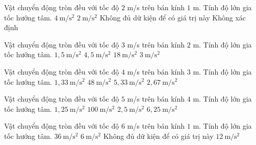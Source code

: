 

\begin{ex}
Vật chuyển động tròn đều với tốc độ $2$ m/s trên bán kính $1$ m. Tính độ lớn gia tốc hướng tâm.
\choice
{\True $4\ \mathrm{m/s^2}$}
{$2\ \mathrm{m/s^2}$}
{Không đủ dữ kiện để có giá trị này}
{Không xác định}
\end{ex}

\begin{ex}
Vật chuyển động tròn đều với tốc độ $3$ m/s trên bán kính $2$ m. Tính độ lớn gia tốc hướng tâm.
\choice
{$1,5\ \mathrm{m/s^2}$}
{\True $4,5\ \mathrm{m/s^2}$}
{$18\ \mathrm{m/s^2}$}
{$3\ \mathrm{m/s^2}$}
\end{ex}

\begin{ex}
Vật chuyển động tròn đều với tốc độ $4$ m/s trên bán kính $3$ m. Tính độ lớn gia tốc hướng tâm.
\choice
{$1,33\ \mathrm{m/s^2}$}
{$48\ \mathrm{m/s^2}$}
{\True $5,33\ \mathrm{m/s^2}$}
{$2,67\ \mathrm{m/s^2}$}
\end{ex}

\begin{ex}
Vật chuyển động tròn đều với tốc độ $5$ m/s trên bán kính $4$ m. Tính độ lớn gia tốc hướng tâm.
\choice
{$1,25\ \mathrm{m/s^2}$}
{$100\ \mathrm{m/s^2}$}
{$2,5\ \mathrm{m/s^2}$}
{\True $6,25\ \mathrm{m/s^2}$}
\end{ex}

\begin{ex}
Vật chuyển động tròn đều với tốc độ $6$ m/s trên bán kính $1$ m. Tính độ lớn gia tốc hướng tâm.
\choice
{\True $36\ \mathrm{m/s^2}$}
{$6\ \mathrm{m/s^2}$}
{Không đủ dữ kiện để có giá trị này}
{$12\ \mathrm{m/s^2}$}
\end{ex}

